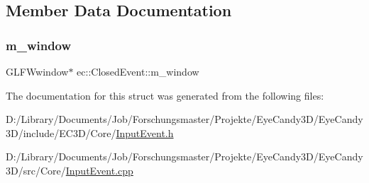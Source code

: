 \subsection{Member Data Documentation}
\mbox{\label{structec_1_1_closed_event_acd70453a645b12b21857e4e3a47f1294}} 
\subsubsection{\texorpdfstring{m\+\_\+window}{m\_window}}
{\footnotesize\ttfamily G\+L\+F\+Wwindow$\ast$ ec\+::\+Closed\+Event\+::m\+\_\+window}



The documentation for this struct was generated from the following files\+:\begin{DoxyCompactItemize}
\item 
D\+:/\+Library/\+Documents/\+Job/\+Forschungsmaster/\+Projekte/\+Eye\+Candy3\+D/\+Eye\+Candy3\+D/include/\+E\+C3\+D/\+Core/\mbox{\hyperlink{_input_event_8h}{Input\+Event.\+h}}\item 
D\+:/\+Library/\+Documents/\+Job/\+Forschungsmaster/\+Projekte/\+Eye\+Candy3\+D/\+Eye\+Candy3\+D/src/\+Core/\mbox{\hyperlink{_input_event_8cpp}{Input\+Event.\+cpp}}\end{DoxyCompactItemize}
